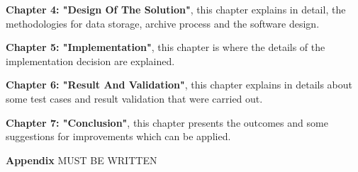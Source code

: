         \par
        \textbf{Chapter 4: "Design Of The Solution"}, this chapter explains in detail, the 
        methodologies for data storage, archive process and the software design.

        \par
        \textbf{Chapter 5: "Implementation"}, this chapter is where the details of the 
        implementation decision are explained.

        \par
        \textbf{Chapter 6: "Result And Validation"}, this chapter explains in details about 
        some test cases and result validation that were carried out.

        \par
        \textbf{Chapter 7: "Conclusion"}, this chapter presents the outcomes and some 
        suggestions for improvements which can be applied.
        
        \par
        \textbf{Appendix}
        MUST BE WRITTEN

